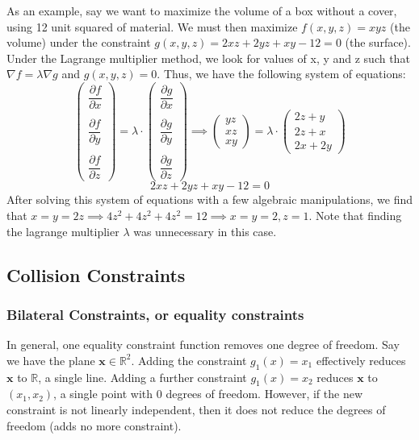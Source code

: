 \documentclass{article}
\begin{document}
As an example, say we want to maximize the volume of a box without a cover, using 12 unit squared of material. We must then maximize $f(x,y,z) = xyz $ (the volume) under the constraint $g(x,y,z) = 2xz + 2yz + xy - 12 = 0$ (the surface). Under the Lagrange multiplier method, we look for values of x, y and z such that $\nabla f = \lambda \nabla g$ and $g(x,y,z) = 0$. Thus, we have the following system of equations:
\begin{equation}
\begin{pmatrix}
    \dfrac{\partial f}{\partial x} \\ \\ \dfrac{\partial f}{\partial y} \\ \\ \dfrac{\partial f}{\partial z}
\end{pmatrix} = 
\lambda \cdot
\begin{pmatrix}
    \dfrac{\partial g}{\partial x} \\ \\ \dfrac{\partial g}{\partial y} \\ \\ \dfrac{\partial g}{\partial z}
\end{pmatrix} \implies 
\begin{pmatrix}
    yz \\ xz \\ xy
\end{pmatrix} = 
\lambda \cdot
\begin{pmatrix}
    2z+y \\ 2z+x \\ 2x + 2y
\end{pmatrix}
\end{equation}
\begin{equation}
2xz + 2yz + xy - 12 = 0
\end{equation}
After solving this system of equations with a few algebraic manipulations, we find that $x = y = 2z \implies 4 z^2+ 4 z^2+ 4 z^2 = 12 \implies x = y = 2, z=1$. Note that finding the lagrange multiplier $\lambda$ was unnecessary in this case.

\subsection{Collision Constraints}
\subsubsection{Bilateral Constraints, or equality constraints}
In general, one equality constraint function removes one degree of freedom. Say we have the plane $\mathbf{x} \in \mathbb{R}^2$. Adding the constraint $g_1(x) = x_1$ effectively reduces $\mathbf{x}$ to $\mathbb{R}$, a single line. Adding a further constraint $g_1(x) = x_2$ reduces $\mathbf{x}$ to $(x_1, x_2)$, a single point with 0 degrees of freedom. However, if the new constraint is not linearly independent, then it does not reduce the degrees of freedom (adds no more constraint).
\end{document}
